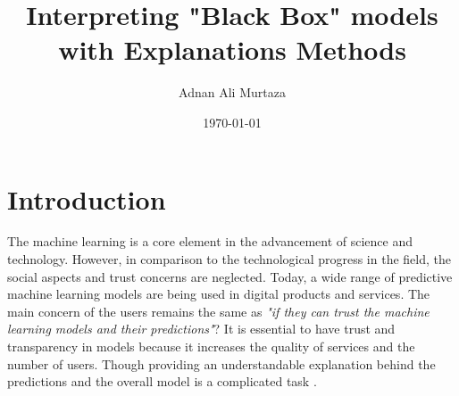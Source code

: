 \documentclass[english]{tktltiki2}
\title{Interpreting "Black Box" models with Explanations Methods}
\author{Adnan Ali Murtaza}
\date{\today}
\theoremstyle{definition}
\theoremstyle{remark}
\begin{document}

\frontmatter      %

\maketitle        %
\makeabstract     %

\tableofcontents  %

\mainmatter       %
\section{Introduction} %

%	
%
%

The machine learning is a core element in the advancement of science and technology. However, in comparison to the technological progress in the field, the social aspects and trust concerns are neglected. Today, a wide range of predictive machine learning models are being used in digital products and services. The main concern of the users remains the same as \textit{"if they can trust the machine learning models and their predictions"}? It is essential to have trust and transparency in models because it increases the quality of services and the number of users. Though providing an understandable explanation behind the predictions and the overall model is a complicated task \citep{lipton2016mythos}.
\end{document}
